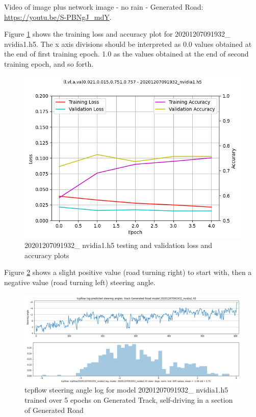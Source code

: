 Video of image plus network image - no rain - Generated Road:  
\url{https://youtu.be/S-PBNgJ_mdY}.  

Figure \ref{fig:20201207091932_nvidia1_accuracy} 
shows the training loss and accuracy plot for 20201207091932\_ nvidia1.h5.
The x axis divisions should be interpreted as 0.0 values obtained at the end of first training epoch.
1.0 as the values obtained at the end of second training epoch, and so forth.

\begin{figure}[ht]
\centering
\includegraphics[width=\textwidth]{Figures/20201207091932_nvidia1_accuracy.png}
\caption{20201207091932\_ nvidia1.h5 testing and validation loss and accuracy plots}
\label{fig:20201207091932_nvidia1_accuracy}
\end{figure}


Figure \ref{fig:20201207091932_nvidia1_tcpflow} shows a slight positive value (road turning right) to start with, then a negative value (road turning left) steering angle.

\begin{figure}[ht]
 \centering 
 \includegraphics[width=\textwidth]{Figures/20201207091932_nvidia1_tcpflow.png}
 \caption{tcpflow steering angle log for model 20201207091932\_ nvidia1.h5 trained over 5 epochs on Generated Track, self-driving in a section of Generated Road}
 \label{fig:20201207091932_nvidia1_tcpflow}
\end{figure}

